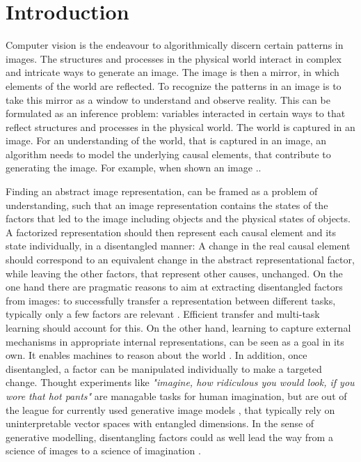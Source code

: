 \chapter{Introduction}

	Computer vision is the endeavour to algorithmically discern certain patterns in images. The structures and processes in the physical world interact in complex and intricate ways to generate an image. The image is then a mirror, in which elements of the world are reflected.
	To recognize the patterns in an image is to take this mirror as a window to understand and observe reality.
	This can be formulated as an inference problem: variables interacted in certain ways to
	that reflect structures and processes in the physical world. The world is captured in an image. For an understanding of the world, that is captured in an image, an algorithm needs to model the underlying causal elements, that contribute to generating the image.
	For example, when shown an image ..

	Finding an abstract image representation, can be framed as a problem of understanding, such that an image representation contains the states of the factors that led to the image including objects and the physical states of objects.
	A factorized representation should then represent each causal element and its state individually, in a disentangled manner: A change in the real causal element should correspond to an equivalent change in the abstract representational factor, while leaving the other factors, that represent other causes, unchanged.
	On the one hand there are pragmatic reasons to aim at extracting disentangled factors from images: to successfully transfer a representation between different tasks, typically only a few factors are relevant \cite{Bengio:2013bu}.
	Efficient transfer and multi-task learning should account for this.
	On the other hand, learning to capture external mechanisms in appropriate internal representations, can be seen as a goal in its own.
	It enables machines to reason about the world \cite{Pearl:2018im}.
	In addition, once disentangled, a factor can be manipulated individually to make a targeted change.
	Thought experiments like \textit{"imagine, how ridiculous you would look, if you wore that hot pants"} are managable tasks for human imagination, but are out of the league for currently used generative image models \cite{Goodfellow:2014td, Kingma:2013tz}, that typically rely on uninterpretable vector spaces with entangled dimensions.
	In the sense of generative modelling, disentangling factors could as well lead the way from a science of images to a science of imagination \cite{Mahadevan:2018tz}.

